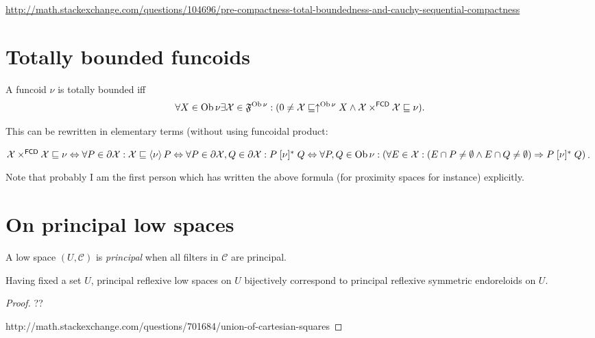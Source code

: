 \url{http://math.stackexchange.com/questions/104696/pre-compactness-total-boundedness-and-cauchy-sequential-compactness}

\section{Totally bounded funcoids}

\begin{defn}
  A funcoid $\nu$ is totally bounded iff
  \[ \forall X \in \operatorname{Ob} \nu \exists \mathcal{X} \in
     \mathfrak{F}^{\operatorname{Ob} \nu} : (0 \neq \mathcal{X} \sqsubseteq
     \uparrow^{\operatorname{Ob} \nu} X \wedge \mathcal{X}
     \times^{\mathsf{FCD}} \mathcal{X} \sqsubseteq \nu) . \]
\end{defn}

This can be rewritten in elementary terms (without using funcoidal product:

$\mathcal{X} \times^{\mathsf{FCD}} \mathcal{X} \sqsubseteq \nu
\Leftrightarrow \forall P \in \partial \mathcal{X} : \mathcal{X} \sqsubseteq
\left\langle \nu\right\rangle P \Leftrightarrow \forall P \in \partial \mathcal{X}, Q
\in \partial \mathcal{X} : P \mathrel{[\nu]^{\ast}} Q \Leftrightarrow \forall
P, Q \in \operatorname{Ob} \nu : \left( \forall E \in \mathcal{X} : (E \cap P \neq
\emptyset \wedge E \cap Q \neq \emptyset) \Rightarrow P \mathrel{[\nu]^{\ast}}
Q \right)$.

Note that probably I am the first person which has written the above formula
(for proximity spaces for instance) explicitly.

\section{On principal low spaces}

\begin{defn}
  A low space $\left( U , \mathscr{C} \right)$ is \emph{principal}
  when all filters in $\mathscr{C}$ are principal.
\end{defn}

\begin{prop}
  Having fixed a set $U$, principal reflexive low spaces on $U$
  bijectively correspond to principal reflexive symmetric endoreloids on $U$.
\end{prop}

\begin{proof}
  ??
  
  http://math.stackexchange.com/questions/701684/union-of-cartesian-squares
\end{proof}


